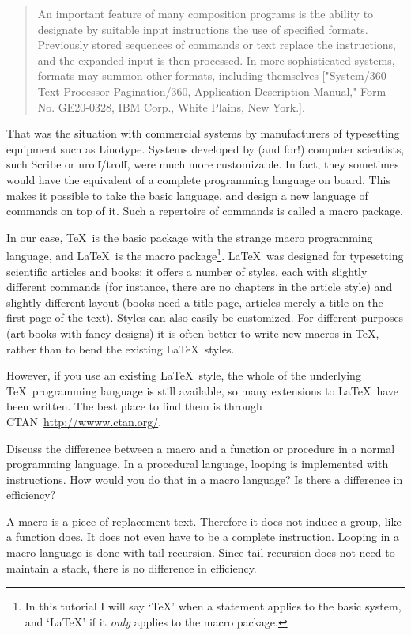\begin{quote}
An important feature of many composition programs is the ability to
designate by suitable input instructions the use of specified
formats. Previously stored sequences of commands or text replace the
instructions, and the expanded input is then processed. In more
sophisticated systems, formats may summon other formats, including
themselves ["System/360 Text Processor Pagination/360, Application
  Description Manual," Form No. GE20-0328, IBM Corp., White Plains,
  New York.].
\end{quote}

That was the situation with commercial systems by manufacturers of
typesetting equipment such as Linotype. Systems developed by (and
for!) computer scientists, such Scribe or nroff/troff, were much more
customizable. In fact, they sometimes would have the equivalent of a
complete programming language on board. This makes it possible to take
the basic language, and design a new language of commands on top of
it. Such a repertoire of commands is called a macro package.

In our case, \TeX\ is the basic package with the strange macro
programming language, and \LaTeX\ is the macro package\footnote{In
  this tutorial I will say `\TeX' when a statement applies to the
  basic system, and `\LaTeX' if it \emph{only} applies to the macro
  package.}. \LaTeX\ was designed for typesetting scientific articles
and books: it offers a number of styles, each with slightly different
commands (for instance, there are no chapters in the article style)
and slightly different layout (books need a title page, articles
merely a title on the first page of the text). Styles can also easily
be customized.  For different purposes (art books with fancy designs)
it is often better to write new macros in \TeX, rather than to bend
the existing \LaTeX\ styles.

However, if you use an existing \LaTeX\ style, the whole of the
underlying \TeX\ programming language is still available, so many
extensions to \LaTeX\ have been written. The best place to find them is
through CTAN~\url{http://wwww.ctan.org/}.

\begin{594exercise}
 Discuss the difference between a macro and a function or
  procedure in a normal programming language. In a procedural
  language, looping is implemented with  instructions. How
  would you do that in a macro language? Is there a difference in
  efficiency?
\end{594exercise}
\begin{answer}
A macro is a piece of replacement text. Therefore it does not induce a
group, like a function does. It does not even have to be a complete
instruction.  Looping in a macro language is done with tail
recursion. Since tail recursion does not need to maintain a stack,
there is no difference in efficiency.
\end{answer}

